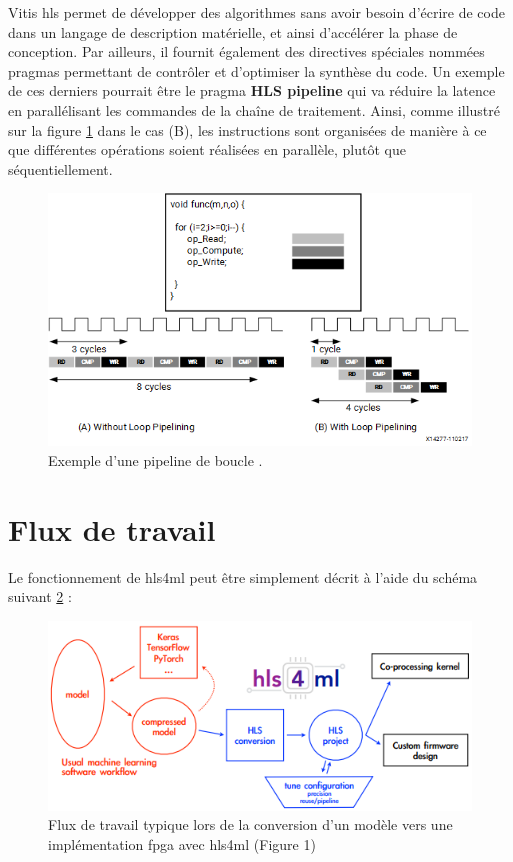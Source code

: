 Vitis \acrshort{hls} permet de développer des algorithmes sans avoir besoin d'écrire de code dans un langage de description matérielle, et ainsi d'accélérer la phase de conception. Par ailleurs, il fournit également des directives spéciales nommées pragmas permettant de contrôler et d'optimiser la synthèse du code. Un exemple de ces derniers pourrait être le pragma \textbf{HLS pipeline} qui va réduire la latence en parallélisant les commandes de la chaîne de traitement. Ainsi, comme illustré sur la figure \ref{fig:pipeline_pragma} dans le cas (B), les instructions sont organisées de manière à ce que différentes opérations soient réalisées en parallèle, plutôt que séquentiellement.

\begin{figure}[hbt!]
    \centering
    \includegraphics[scale=0.9]{Figures/hls4ml/pipeline_pragma.png}
    \caption{Exemple d'une pipeline de boucle \cite{noauthor_tme1532103642766image_nodate}.}
    \label{fig:pipeline_pragma}
\end{figure}

\break

\section{Flux de travail}
\label{hls4ml_workflow}

Le fonctionnement de \acrshort{hls4ml} peut être simplement décrit à l'aide du schéma suivant \ref{fig:hls4ml_workflow} :

\begin{figure}[hbt!]
    \centering
    \includegraphics[scale=0.7]{Figures/hls4ml/hls4ml_workflow.png}
    \caption{Flux de travail typique lors de la conversion d'un modèle vers une implémentation \acrshort{fpga} avec \acrshort{hls4ml} \cite{duarte_fast_2018} (Figure 1)}
    \label{fig:hls4ml_workflow}
\end{figure}


